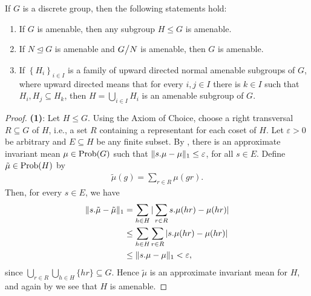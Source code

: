 \begin{proposition}\label{?? lol}
If $G$ is a discrete group, then the following statements hold:
\begin{enumerate}
\item If $G$ is amenable, then any subgroup $H \leq G$ is amenable.
\item If $N \trianglelefteq G$ is amenable and $G\bign/N$ is amenable, then $G$ is amenable.
\item If $\left\{H_{i} \right\}_{i \in I}$ is a family of upward directed normal amenable subgroups of $G$, where upward directed means that for every $i,j \in I$ there is $k \in I$ such that $H_{i}, H_{j} \subseteq H_{k}$, then $\displaystyle H = {\bigcup_{i \in I} H_{i}}$ is an amenable subgroup of $G$.
\end{enumerate}
\begin{proof}
\indent \textbf{(1)}: Let $H \leq G$. Using the Axiom of Choice, choose a right transversal $R \subseteq G$ of $H$, i.e., a set $R$ containing a representant for each coset of $H$. Let $\varepsilon>0$ be arbitrary and $E \subseteq H$ be any finite subset. By , there is an approximate invariant mean $\mu \in \operatorname{Prob}(G)$ such that $\lVert s .\mu - \mu \rVert_1 \leq \varepsilon$, for all $s \in E$. Define $\tilde{\mu} \in \operatorname{Prob}(H)$ by
\begin{align*}
\tilde{\mu}(g)=\sum_{r \in R}\mu(gr).
\end{align*}
Then, for every $s \in E$, we have
\begin{align*}
\lVert s.\tilde{\mu} - \tilde{\mu} \rVert_1 &= \sum_{h \in H} |  \sum_{r \in R} s.\mu(hr)-\mu(hr)|\\
&\leq \sum_{h \in H} \sum_{r \in R} |s.\mu(hr)-\mu(hr)|\\
&\leq \lVert s .\mu-\mu\rVert_1<\varepsilon,
\end{align*}
since $\bigcup_{r \in R} \bigcup_{h \in H}\{hr\} \subseteq G$. Hence $\tilde{\mu}$ is an approximate invariant mean for $H$, and again by  we see that $H$ is amenable.


\end{proof}
\end{proposition}
